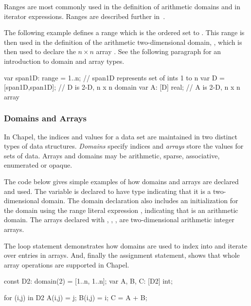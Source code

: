 Ranges are most commonly used in the definition of arithmetic domains
and in iterator expressions.  Ranges are described further
in~.

\begin{example}
The following example defines a range  which is the
ordered set  to .  This range is then used in the
definition of the arithmetic two-dimensional domain, , which
is then used to declare the $n \times n$ array .  See the
following paragraph for an introduction to domain and array types.
 
\begin{chapel}
var span1D: range = 1..n; // span1D represents set of ints 1 to n
var D = [span1D,span1D];  // D is 2-D, n x n domain
var A: [D] real;          // A is 2-D, n x n array
\end{chapel}
\end{example}

\subsubsection{Domains and Arrays}
In Chapel, the indices and values for a data set are maintained
in two distinct types of data structures.  \emph{Domains} specify indices
and \emph{arrays} store the values for sets of data.  Arrays and domains may
be arithmetic, sparse, associative, enumerated or opaque.

\begin{example}
The code below gives simple examples of how domains and arrays are
declared and used.  The variable  is declared to have
type  indicating that it is a two-dimensional domain.
The domain declaration also includes an initialization for the domain
using the range literal expression , indicating
that  is an arithmetic domain.  The arrays declared
with , , ,  are two-dimensional
arithmetic integer arrays.

The  loop statement demonstrates how domains are used to
index into and iterate over entries in arrays.  And, finally the
assignment statement,  shows that whole array
operations are supported in Chapel.

\begin{chapel}
const D2: domain(2) = [1..n, 1..n];
var A, B, C: [D2] int;

for (i,j) in D2 {
  A(i,j) = j;
  B(i,j) = i;
}
C = A + B;
\end{chapel}
\end{example}

